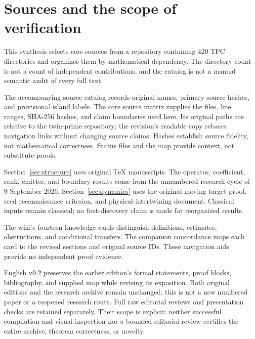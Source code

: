 \section{Sources and the scope of verification}\label{sec:provenance}
This synthesis selects core sources from a repository containing 420 TPC directories and organizes them by mathematical dependency. The directory count is not a count of independent contributions, and the catalog is not a manual semantic audit of every full text.

The accompanying source catalog records original names, primary-source hashes, and provisional island labels. The core source matrix supplies the files, line ranges, SHA-256 hashes, and claim boundaries used here. Its original paths are relative to the twin-prime repository; the revision's readable copy rebases navigation links without changing source claims. Hashes establish source fidelity, not mathematical correctness. Status files and the map provide context, not substitute proofs.

Section~\ref{sec:structure} uses original TeX manuscripts. The operator, coefficient, rank, emitter, and boundary results come from the unnumbered research cycle of 9 September 2026. Section~\ref{sec:dynamics} uses the original moving-target proof, seed reconnaissance criterion, and physical-intertwining document. Classical inputs remain classical; no first-discovery claim is made for reorganized results.

The wiki's fourteen knowledge cards distinguish definitions, estimates, obstructions, and conditional transfers. The companion concordance maps each card to the revised sections and original source IDs. These navigation aids provide no independent proof evidence.

English v0.2 preserves the earlier edition's formal statements, proof blocks, bibliography, and supplied map while revising its exposition. Both original editions and the research archive remain unchanged; this is not a new numbered paper or a reopened research route. Full raw editorial reviews and presentation checks are retained separately. Their scope is explicit: neither successful compilation and visual inspection nor a bounded editorial review certifies the entire archive, theorem correctness, or novelty.
